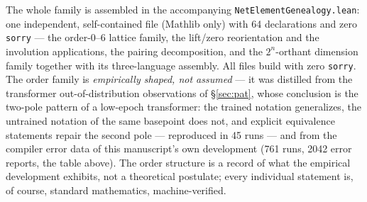\documentclass{article}
\begin{document}
The whole family is assembled in the accompanying
\texttt{NetElementGenealogy.lean}: one independent, self-contained
file (Mathlib only) with 64 declarations and zero \texttt{sorry} ---
the order-0--6 lattice family, the lift/zero reorientation and the
involution applications, the pairing decomposition, and the
$2^n$-orthant dimension family together with its three-language
assembly. All files build with zero \texttt{sorry}. The order family is
\emph{empirically shaped, not assumed} --- it was distilled from the
transformer out-of-distribution observations of \S\ref{sec:pat}, whose
conclusion is the two-pole pattern of a low-epoch transformer: the
trained notation generalizes, the untrained notation of the same
basepoint does not, and explicit equivalence statements repair the
second pole --- reproduced in 45 runs \cite{fourtheorems} --- and from
the compiler error data of
this manuscript's own development (761 runs, 2042 error reports, the
table above). The order structure is a record of what the empirical
development exhibits, not a theoretical postulate; every individual
statement is, of course, standard mathematics, machine-verified.
\end{document}
